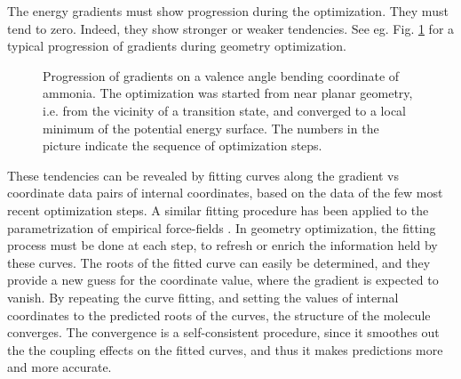 \documentclass[prl,aps,twocolumn,showpacs,twocolumngrid,superbib]{revtex4}
\begin{document}
The energy gradients must show progression during the optimization.
They must tend to zero. 
Indeed, they show stronger or weaker tendencies.
See eg. Fig. \ref{NH3outp6} for a typical progression of gradients 
during geometry optimization.
\begin{figure}[h]
\caption{
\small  
Progression of gradients on a valence angle bending coordinate of
ammonia. The optimization was started from near planar geometry, i.e.
from the vicinity of a transition state, and converged to a local 
minimum of the potential energy surface. The numbers in the picture
indicate the sequence of optimization steps.
\label{NH3outp6}
}
\end{figure}

These tendencies can be revealed by
fitting curves along the gradient vs coordinate data pairs
of internal coordinates, based on the data of the few most
recent optimization steps.
A similar fitting procedure has been applied to
the parametrization of empirical
force-fields \cite{force-field-fitting}. 
In geometry optimization, the fitting process
must be done at each step, to refresh or enrich the information
held by these curves. 
The roots of the fitted curve can easily be determined, 
and they provide a new guess for the coordinate value, where the
gradient is expected to vanish.
By repeating the curve fitting, and setting the values of internal
coordinates to the predicted roots of the curves,
the structure of the molecule
converges. The convergence is a self-consistent procedure, since
it smoothes out the the coupling effects on the fitted curves, and thus
it makes predictions more and more accurate.
\end{document}
